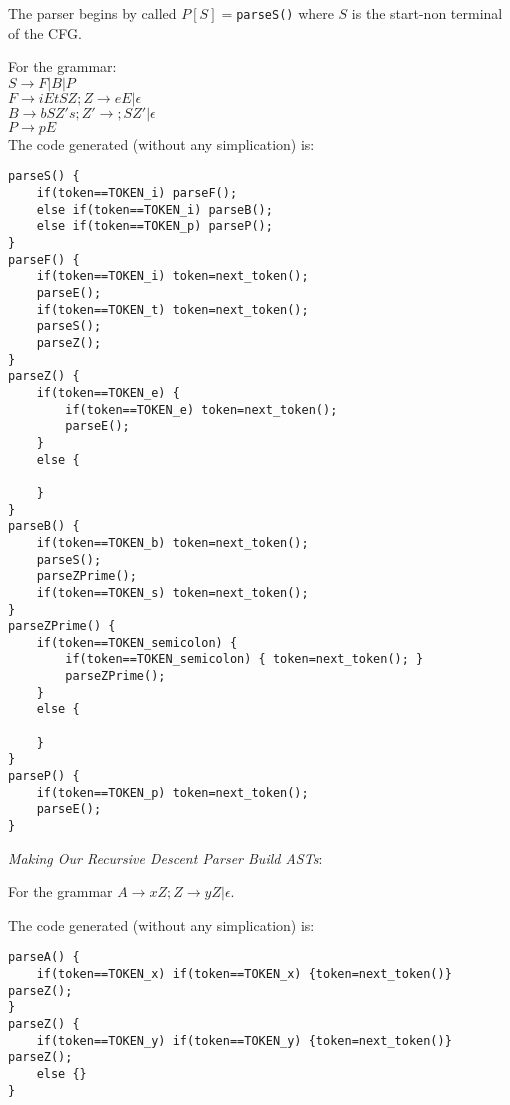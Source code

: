 The parser begins by called $P[S]=$\lstinline{parseS()} where $S$ is the start-non terminal 
of the CFG.

\frmrule 

\begin{example}
For the grammar: \\
$S \rightarrow F|B|P$ \\
$F \rightarrow i E t S Z; Z \rightarrow eE | \epsilon$ \\
$B \rightarrow b S Z' s; Z' \rightarrow ;SZ' | \epsilon$ \\
$P \rightarrow p E$ \\

The code generated (without any simplication) is:
\begin{lstlisting}
parseS() {
	if(token==TOKEN_i) parseF();
	else if(token==TOKEN_i) parseB();
	else if(token==TOKEN_p) parseP();
}
parseF() {
	if(token==TOKEN_i) token=next_token();
	parseE();
	if(token==TOKEN_t) token=next_token();
	parseS();
	parseZ();
}
parseZ() {
	if(token==TOKEN_e) {
		if(token==TOKEN_e) token=next_token();
		parseE();
	}
	else {

	}
}
parseB() {
	if(token==TOKEN_b) token=next_token();
	parseS();
	parseZPrime();
	if(token==TOKEN_s) token=next_token();
}
parseZPrime() {
	if(token==TOKEN_semicolon) {
		if(token==TOKEN_semicolon) { token=next_token(); }
		parseZPrime();
	}
	else {

	}
}
parseP() {
	if(token==TOKEN_p) token=next_token();
	parseE();
}
\end{lstlisting}

\end{example}


\frmrule 

\textit{Making Our Recursive Descent Parser Build ASTs}:



\frmrule 



\begin{example}
For the grammar $A \rightarrow xZ; Z \rightarrow yZ | \epsilon$.

The code generated (without any simplication) is:
\begin{lstlisting}
parseA() {
	if(token==TOKEN_x) if(token==TOKEN_x) {token=next_token()} parseZ();
}
parseZ() {
	if(token==TOKEN_y) if(token==TOKEN_y) {token=next_token()} parseZ();
	else {}
}
\end{lstlisting}

\end{example}



